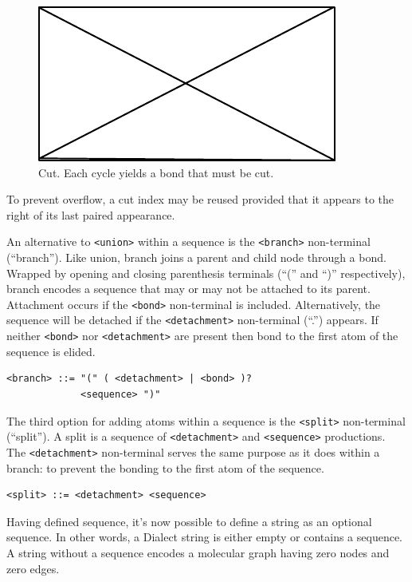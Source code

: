 \documentclass{article}
\def\ttt{\texttt}
\begin{document}
\begin{figure}
    \centering
    \includegraphics{filler}
    \caption{Cut. Each cycle yields a bond that must be cut.}
    \label{fig:cut}
\end{figure}

To prevent overflow, a cut index may be reused provided that it appears to the right of its last paired appearance.

An alternative to \ttt{<union>} within a sequence is the \ttt{<branch>} non-terminal (\enquote{branch}). Like union, branch joins a parent and child node through a bond. Wrapped by opening and closing parenthesis terminals (\enquote{(} and \enquote{)} respectively), branch encodes a sequence that may or may not be attached to its parent. Attachment occurs if the \ttt{<bond>} non-terminal is included. Alternatively, the sequence will be detached if the \ttt{<detachment>} non-terminal (\enquote{.}) appears. If neither \ttt{<bond>} nor \ttt{<detachment>} are present then bond to the first atom of the sequence is elided.

\begin{lstlisting}
<branch> ::= "(" ( <detachment> | <bond> )?
             <sequence> ")"
\end{lstlisting}

The third option for adding atoms within a sequence is the \ttt{<split>} non-terminal (\enquote{split}). A split is a sequence of \ttt{<detachment>} and \ttt{<sequence>} productions. The \ttt{<detachment>} non-terminal serves the same purpose as it does within a branch: to prevent the bonding to the first atom of the sequence.

\begin{lstlisting}
<split> ::= <detachment> <sequence>
\end{lstlisting}

Having defined sequence, it's now possible to define a string as an optional sequence. In other words, a Dialect string is either empty or contains a sequence. A string without a sequence encodes a molecular graph having zero nodes and zero edges.
\end{document}
